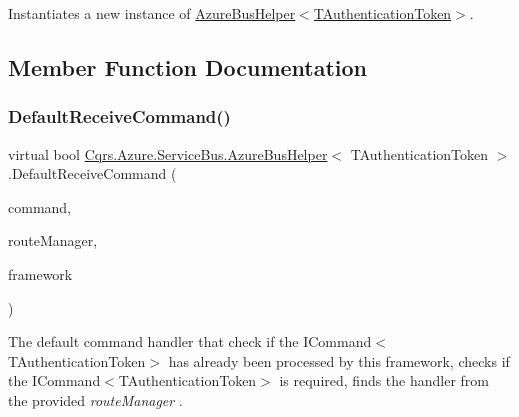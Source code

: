 Instantiates a new instance of \hyperlink{classCqrs_1_1Azure_1_1ServiceBus_1_1AzureBusHelper_aed54a79efffdf9799a3baae46c2b7fb4_aed54a79efffdf9799a3baae46c2b7fb4}{Azure\+Bus\+Helper$<$\+T\+Authentication\+Token$>$}. 



\subsection{Member Function Documentation}
\mbox{\label{classCqrs_1_1Azure_1_1ServiceBus_1_1AzureBusHelper_ae35c260f46f8aa7ba928815187b9088e_ae35c260f46f8aa7ba928815187b9088e}} 
\subsubsection{\texorpdfstring{Default\+Receive\+Command()}{DefaultReceiveCommand()}}
{\footnotesize\ttfamily virtual bool \hyperlink{classCqrs_1_1Azure_1_1ServiceBus_1_1AzureBusHelper}{Cqrs.\+Azure.\+Service\+Bus.\+Azure\+Bus\+Helper}$<$ T\+Authentication\+Token $>$.Default\+Receive\+Command (\begin{DoxyParamCaption}\item[{\hyperlink{interfaceCqrs_1_1Commands_1_1ICommand}{I\+Command}$<$ T\+Authentication\+Token $>$}]{command,  }\item[{\hyperlink{classCqrs_1_1Bus_1_1RouteManager}{Route\+Manager}}]{route\+Manager,  }\item[{string}]{framework }\end{DoxyParamCaption})\hspace{0.3cm}{\ttfamily [virtual]}}



The default command handler that check if the I\+Command$<$\+T\+Authentication\+Token$>$ has already been processed by this framework, checks if the I\+Command$<$\+T\+Authentication\+Token$>$ is required, finds the handler from the provided {\itshape route\+Manager} . 


